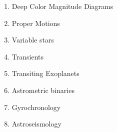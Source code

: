 \begin{enumerate}

\item Deep Color Magnitude Diagrams


\item Proper Motions


\item Variable stars


\item Transients

\item Transiting Exoplanets

\item Astrometric binaries

\item Gyrochronology

\item Astroseismology

\end{enumerate}


\navigationbar
